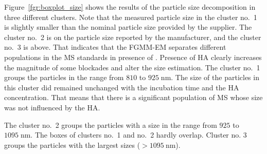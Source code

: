 \documentclass[journal=langd5,manuscript=article]{achemso}
\begin{document}

Figure~\ref{fgr:boxplot_size} shows the results of the particle size decomposition in three different clusters. Note that the measured particle size in the cluster no.~1 is slightly smaller than the nominal particle size provided by the supplier. 
The cluster no.~2 is on the particle size reported by the manufacturer, and the cluster no.~3 is above. That indicates that the FGMM-EM separates different populations in the MS standards in presence of . Presence of HA clearly increases the  magnitude of some blockades and alter the size estimation.
The cluster no.~1 groups the particles in the range from $810$ to $925\;\mathrm{nm}$. The size of the particles in this cluster did remained unchanged with the incubation time and the HA concentration. That means that there is a significant population of MS whose size was not influenced by the HA.


The cluster no.~2 groups the particles with a size in the range from $925$ to $1095\;\mathrm{nm}$. The boxes of clusters no.~1 and no.~2 hardly overlap. 
Cluster no. 3 groups the particles with the largest sizes ($> 1095~\mathrm{nm}$). 
\end{document}
